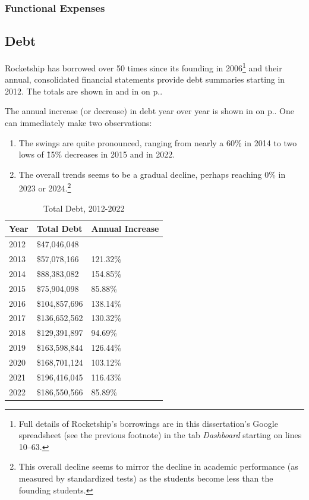 \subsubsection{Functional Expenses}\indent%
\label{sec:functional_expenses}

\subsection{Debt}\indent%
\label{sec:debt}

Rocketship has borrowed over 50 times since its founding in 2006\footnote{Full details of Rocketship's borrowings are in this dissertation's Google spreadsheet (see the previous footnote) in the tab \textit{Dashboard} starting on lines 10–63.} 
and their annual, consolidated financial statements provide debt summaries starting in 2012. The totals are shown in  and in  on p.\pageref{fig:total_debt}.

The annual increase (or decrease) in debt year over year is shown in  on p.\pageref{fig:annual_debt_increases}. One can immediately make two observations:
\begin{enumerate}
  \item The swings are quite pronounced, ranging from nearly a 60\% in 2014 to two lows of \~15\% decreases in 2015 and in 2022.
  \item The overall trends seems to be a gradual decline, perhaps reaching 0\% in 2023 or 2024.\footnote{This overall decline seems to mirror the decline in academic performance (as measured by standardized tests) as the students become less than the founding students. }
\end{enumerate}

\begin{table}[ht]\caption{Total Debt, 2012-2022}\label{tab:total_debt}
  \begin{tabular}{lll}
    \toprule
    \textbf{Year} & \textbf{Total Debt} & \textbf{Annual Increase}\\
    \midrule
    2012 &  \$47,046,048 & \\
    2013 &  \$57,078,166 & 121.32\% \\
    2014 &  \$88,383,082 & 154.85\% \\
    2015 &  \$75,904,098 &  85.88\% \\
    2016 & \$104,857,696 & 138.14\% \\
    2017 & \$136,652,562 & 130.32\% \\
    2018 & \$129,391,897 &  94.69\% \\
    2019 & \$163,598,844 & 126.44\% \\
    2020 & \$168,701,124 & 103.12\% \\ 
    2021 & \$196,416,045 & 116.43\% \\
    2022 & \$186,550,566 &  85.89\% \\
    \bottomrule
  \end{tabular}
\end{table}

